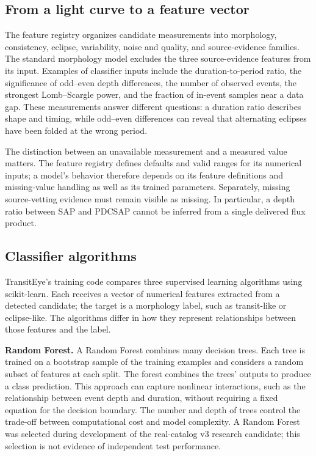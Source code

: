 \documentclass[11pt,a4paper]{article}
\begin{document}
\subsection{From a light curve to a feature vector}
The feature registry organizes candidate measurements into morphology, consistency, eclipse, variability, noise and quality, and source-evidence families. The standard morphology model excludes the three source-evidence features from its input. Examples of classifier inputs include the duration-to-period ratio, the significance of odd--even depth differences, the number of observed events, the strongest Lomb--Scargle power, and the fraction of in-event samples near a data gap. These measurements answer different questions: a duration ratio describes shape and timing, while odd--even differences can reveal that alternating eclipses have been folded at the wrong period.

The distinction between an unavailable measurement and a measured value matters. The feature registry defines defaults and valid ranges for its numerical inputs; a model's behavior therefore depends on its feature definitions and missing-value handling as well as its trained parameters. Separately, missing source-vetting evidence must remain visible as missing. In particular, a depth ratio between SAP and PDCSAP cannot be inferred from a single delivered flux product.

\subsection{Classifier algorithms}
TransitEye's training code compares three supervised learning algorithms using scikit-learn. Each receives a vector of numerical features extracted from a detected candidate; the target is a morphology label, such as transit-like or eclipse-like. The algorithms differ in how they represent relationships between those features and the label.

\textbf{Random Forest.} A Random Forest combines many decision trees. Each tree is trained on a bootstrap sample of the training examples and considers a random subset of features at each split. The forest combines the trees' outputs to produce a class prediction. This approach can capture nonlinear interactions, such as the relationship between event depth and duration, without requiring a fixed equation for the decision boundary. The number and depth of trees control the trade-off between computational cost and model complexity. A Random Forest was selected during development of the real-catalog v3 research candidate; this selection is not evidence of independent test performance.
\end{document}
